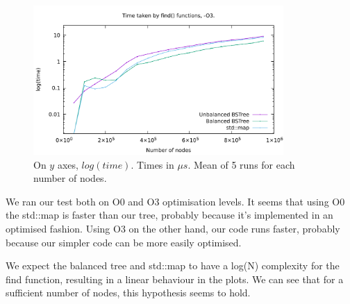 \documentclass[12pt,a4paper,openany]{scrartcl}
\begin{document}
	\begin{figure}[H]
		\centering
		\captionsetup{format=plain}
		\caption{On $y$ axes, $log(time)$. Times in $\mu s$. Mean of 5 runs for each number of nodes.}
		\label{fig:O3}
		\includegraphics[width=0.85\textwidth]{img/plotO3.pdf}
	\end{figure}
	
	
	We ran our test both on O0 and O3 optimisation levels. It seems that using O0 the std::map is faster than our tree, probably because it's implemented in an optimised fashion. Using O3 on the other hand, our code runs faster, probably because our simpler code can be more easily optimised.
	
	We expect the balanced tree and std::map to have a log(N) complexity for the find function, resulting in a linear behaviour in the plots. We can see that for a sufficient number of nodes, this hypothesis seems to hold. 
	
\end{document}

